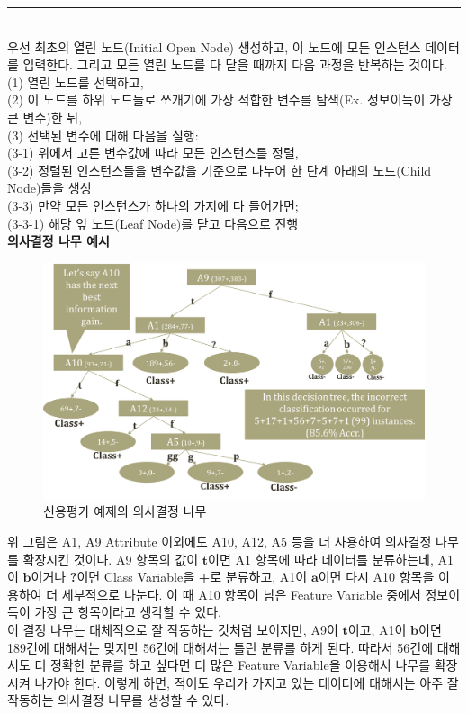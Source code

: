 \documentclass[a4paper]{oblivoir}
\begin{document}
\indent\rule{10cm}{0.4pt} \\
\indent 우선 최초의 열린 노드(Initial Open Node) 생성하고, 이 노드에 모든 인스턴스 데이터를 입력한다. 그리고 모든 열린 노드를 다 닫을 때까지 다음 과정을 반복하는 것이다. \\
\indent (1) 열린 노드를 선택하고,\\
\indent (2) 이 노드를 하위 노드들로 쪼개기에 가장 적합한 변수를 탐색(Ex. 정보이득이 가장 큰 변수)한 뒤,\\
\indent (3) 선택된 변수에 대해 다음을 실행: \\
\indent \indent (3-1) 위에서 고른 변수값에 따라 모든 인스턴스를 정렬,\\
\indent \indent (3-2) 정렬된 인스턴스들을 변수값을 기준으로 나누어 한 단계 아래의 노드(Child Node)들을 생성\\
\indent \indent (3-3) 만약 모든 인스턴스가 하나의 가지에 다 들어가면;\\
\indent \indent \indent (3-3-1) 해당 잎 노드(Leaf Node)를 닫고 다음으로 진행\\

\textbf{의사결정 나무 예시}
\begin{figure}[ht]
\centering
\includegraphics[scale=0.6]{Decision_Tree4.png}
\caption{신용평가 예제의 의사결정 나무}
\label{Figure 2-16}
\end{figure}

\indent 위 그림은 A1, A9 Attribute 이외에도 A10, A12, A5 등을 더 사용하여 의사결정 나무를 확장시킨 것이다. A9 항목의 값이 $\textbf{t}$이면 A1 항목에 따라 데이터를 분류하는데, A1이 $\textbf{b}$이거나 \textbf{?}이면 Class Variable을 \textbf{+}로 분류하고, A1이 $\textbf{a}$이면 다시 A10 항목을 이용하여 더 세부적으로 나눈다. 이 때 A10 항목이 남은 Feature Variable 중에서 정보이득이 가장 큰 항목이라고 생각할 수 있다. \\
\indent 이 결정 나무는 대체적으로 잘 작동하는 것처럼 보이지만, A9이 $\textbf{t}$이고, A1이 $\textbf{b}$이면 189건에 대해서는 맞지만 56건에 대해서는 틀린 분류를 하게 된다. 따라서 56건에 대해서도 더 정확한 분류를 하고 싶다면 더 많은 Feature Variable을 이용해서 나무를 확장시켜 나가야 한다. 이렇게 하면, 적어도 우리가 가지고 있는 데이터에 대해서는 아주 잘 작동하는 의사결정 나무를 생성할 수 있다.
\end{document}
